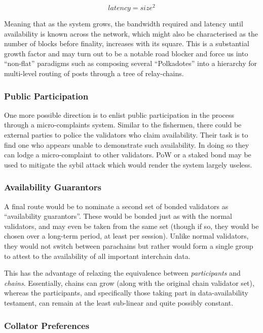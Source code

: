 \documentclass[9pt,oneside]{amsart}
\begin{document}
\begin{multicols}{2}
\begin{equation}
 latency = size^2
\end{equation}

 Meaning that as the system grows, the bandwidth required and latency until availability is known across the network, which might also be characterised as the number of blocks before finality, increases with its square. This is a substantial growth factor and may turn out to be a notable road blocker and force us into ``non-flat'' paradigms such as composing several ``Polkadotes'' into a hierarchy for multi-level routing of posts through a tree of relay-chains.

\subsubsection{Public Participation}

 One more possible direction is to enlist public participation in the process through a micro-complaints system. Similar to the fishermen, there could be external parties to police the validators who claim availability. Their task is to find one who appears unable to demonstrate such availability. In doing so they can lodge a micro-complaint to other validators. PoW or a staked bond may be used to mitigate the sybil attack which would render the system largely useless.

\subsubsection{Availability Guarantors}\label{availability-guarantors}

 A final route would be to nominate a second set of bonded validators as ``availability guarantors''. These would be bonded just as with the normal validators, and may even be taken from the same set (though if so, they would be chosen over a long-term period, at least per session). Unlike normal validators, they would not switch between parachains but rather would form a single group to attest to the availability of all important interchain data.

 This has the advantage of relaxing the equivalence between
\emph{participants} and \emph{chains}. Essentially, chains can grow
 (along with the original chain validator set), whereas the participants, and specifically those taking part in data-availability testament, can remain at the least sub-linear and quite possibly constant.

\subsubsection{Collator Preferences}


\end{multicols}
\end{document}
